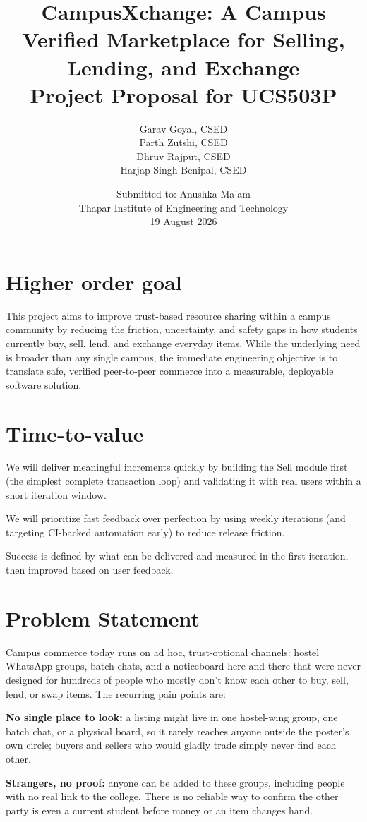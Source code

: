 \documentclass[11pt]{article}
\title{\textbf{CampusXchange: A Campus Verified Marketplace for Selling, Lending, and Exchange}\\[0.3em]
\large Project Proposal for UCS503P}
\author{
Garav Goyal, CSED \\
Parth Zutshi, CSED \\
Dhruv Rajput, CSED \\
Harjap Singh Benipal, CSED
}
\date{Submitted to: Anushka Ma'am \\ Thapar Institute of Engineering and Technology \\ 19 August 2026}
\begin{document}
\maketitle

\section{Higher order goal}
This project aims to improve trust-based resource sharing within a campus community by reducing the friction, uncertainty, and safety gaps in how students currently buy, sell, lend, and exchange everyday items. While the underlying need is broader than any single campus, the immediate engineering objective is to translate safe, verified peer-to-peer commerce into a measurable, deployable software solution.

\section{Time-to-value}
We will deliver meaningful increments quickly by building the Sell module first (the simplest complete transaction loop) and validating it with real users within a short iteration window.

We will prioritize fast feedback over perfection by using weekly iterations (and targeting CI-backed automation early) to reduce release friction.

Success is defined by what can be delivered and measured in the first iteration, then improved based on user feedback.

\section{Problem Statement}
Campus commerce today runs on ad hoc, trust-optional channels: hostel WhatsApp groups, batch chats, and a noticeboard here and there that were never designed for hundreds of people who mostly don't know each other to buy, sell, lend, or swap items. The recurring pain points are:

\textbf{No single place to look:} a listing might live in one hostel-wing group, one batch chat, or a physical board, so it rarely reaches anyone outside the poster's own circle; buyers and sellers who would gladly trade simply never find each other.

\textbf{Strangers, no proof:} anyone can be added to these groups, including people with no real link to the college. There is no reliable way to confirm the other party is even a current student before money or an item changes hand.
\end{document}
